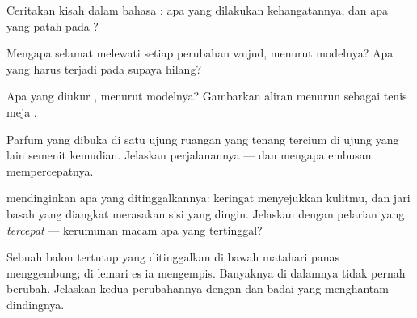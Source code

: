 \begin{exercise}[$\star$]\label{exo:g7:states-of-matter:5}
Ceritakan kisah  dalam bahasa : apa yang dilakukan
kehangatannya, dan apa yang patah pada ?
\end{exercise}

\begin{exercise}[$\star$]\label{exo:g7:states-of-matter:6}
Mengapa  selamat melewati setiap perubahan wujud, menurut
modelnya? Apa yang harus terjadi pada  supaya 
hilang?
\end{exercise}

\begin{exercise}[$\star$]\label{exo:g7:states-of-matter:7}
Apa yang diukur , menurut modelnya? Gambarkan aliran menurun 
sebagai tenis meja .
\end{exercise}

\begin{exercise}[$\star$]\label{exo:g7:states-of-matter:8}
Parfum yang dibuka di satu ujung ruangan yang tenang tercium di ujung
yang lain semenit kemudian. Jelaskan perjalanannya --- dan mengapa
embusan  mempercepatnya.
\end{exercise}

\begin{exercise}[$\star\star$]\label{exo:g7:states-of-matter:9}
 mendinginkan apa yang ditinggalkannya: keringat menyejukkan
kulitmu, dan jari basah yang diangkat merasakan sisi  yang
dingin. Jelaskan dengan pelarian  yang \emph{tercepat} ---
kerumunan macam apa yang tertinggal?
\end{exercise}

\begin{exercise}[$\star\star$]\label{exo:g7:states-of-matter:10}
Sebuah balon tertutup yang ditinggalkan di bawah matahari  panas
menggembung; di lemari es ia mengempis. Banyaknya  di dalamnya
tidak pernah berubah. Jelaskan kedua perubahannya dengan 
 dan badai yang menghantam dindingnya.
\end{exercise}

